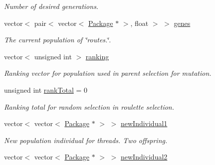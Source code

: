\begin{DoxyCompactItemize}
\begin{DoxyCompactList}\small\item\em Number of desired generations. \end{DoxyCompactList}\item 
vector$<$ pair$<$ vector$<$ \hyperlink{classPackage}{Package} $\ast$ $>$, float $>$ $>$ \hyperlink{classGenetic_ad85db12db467d5cbc46df9d50f9877e8}{genes}
\begin{DoxyCompactList}\small\item\em The current population of \char`\"{}routes.\char`\"{}. \end{DoxyCompactList}\item 
vector$<$ unsigned int $>$ \hyperlink{classGenetic_a687341f8059644cf50f7ca9df2a4789a}{ranking}\hypertarget{classGenetic_a687341f8059644cf50f7ca9df2a4789a}{}\label{classGenetic_a687341f8059644cf50f7ca9df2a4789a}

\begin{DoxyCompactList}\small\item\em Ranking vector for population used in parent selection for mutation. \end{DoxyCompactList}\item 
unsigned int \hyperlink{classGenetic_a171a1d027904295d58f629e078cd75ab}{rank\+Total} = 0\hypertarget{classGenetic_a171a1d027904295d58f629e078cd75ab}{}\label{classGenetic_a171a1d027904295d58f629e078cd75ab}

\begin{DoxyCompactList}\small\item\em Ranking total for random selection in roulette selection. \end{DoxyCompactList}\item 
vector$<$ vector$<$ \hyperlink{classPackage}{Package} $\ast$ $>$ $>$ \hyperlink{classGenetic_acc58ce6bda122b54eff8760dccec2b99}{new\+Individual1}\hypertarget{classGenetic_acc58ce6bda122b54eff8760dccec2b99}{}\label{classGenetic_acc58ce6bda122b54eff8760dccec2b99}

\begin{DoxyCompactList}\small\item\em New population individual for threads. Two offspring. \end{DoxyCompactList}\item 
vector$<$ vector$<$ \hyperlink{classPackage}{Package} $\ast$ $>$ $>$ \hyperlink{classGenetic_ae0c7262cba0c4bca592c8191ca3434de}{new\+Individual2}\hypertarget{classGenetic_ae0c7262cba0c4bca592c8191ca3434de}{}\label{classGenetic_ae0c7262cba0c4bca592c8191ca3434de}


\end{DoxyCompactItemize}
